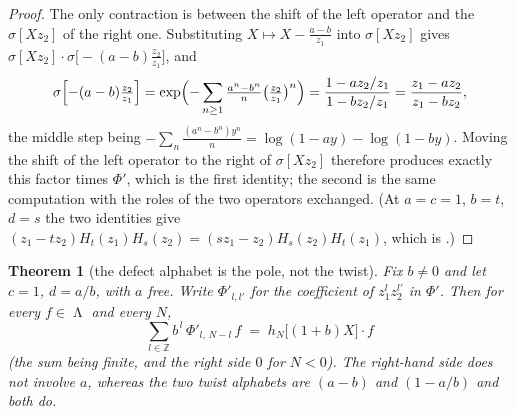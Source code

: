\documentclass[11pt]{article}
\newtheorem{theorem}{Theorem}[section]
\theoremstyle{definition}
\DeclareMathOperator{\Lam}{\Lambda}
\newcommand{\Z}{\mathbb{Z}}
\newcommand{\Hop}{H}
\begin{document}
\begin{proof}
The only contraction is between the shift of the left operator and the $\sigma[Xz_2]$ of the
right one.  Substituting $X\mapsto X-\frac{a-b}{z_1}$ into $\sigma[Xz_2]$ gives
$\sigma[Xz_2]\cdot\sigma\bigl[-(a-b)\tfrac{z_2}{z_1}\bigr]$, and
\[
  \sigma\Bigl[-(a-b)\tfrac{z_2}{z_1}\Bigr]
  =\exp\Bigl(-\sum_{n\ge1}\tfrac{a^n-b^n}{n}\bigl(\tfrac{z_2}{z_1}\bigr)^{n}\Bigr)
  =\frac{1-a z_2/z_1}{1-b z_2/z_1}=\frac{z_1-az_2}{z_1-bz_2},
\]
the middle step being $-\sum_n\frac{(a^n-b^n)y^n}{n}=\log(1-ay)-\log(1-by)$.  Moving the
shift of the left operator to the right of $\sigma[Xz_2]$ therefore produces exactly this
factor times $\Phi'$, which is the first identity; the second is the same computation with
the roles of the two operators exchanged.  (At $a=c=1$, $b=t$, $d=s$ the two identities give
$(z_1-tz_2)\Hop_t(z_1)\Hop_s(z_2)=(sz_1-z_2)\Hop_s(z_2)\Hop_t(z_1)$, which is
\cite[Thm.~2.4]{Q99}.)
\end{proof}

\begin{theorem}[the defect alphabet is the pole, not the twist]\label{thm:C}
Fix $b\neq0$ and let $c=1$, $d=a/b$, with $a$ \emph{free}.  Write $\Phi'_{l,l'}$ for the
coefficient of $z_1^{l}z_2^{l'}$ in $\Phi'$.  Then for every $f\in\Lam$ and every $N$,
\[
  \boxed{\ \sum_{l\in\Z}b^{\,l}\,\Phi'_{l,\,N-l}\,f\;=\;h_N\bigl[(1+b)X\bigr]\cdot f\ }
\]
(the sum being finite, and the right side $0$ for $N<0$).  The right-hand side does not
involve $a$, whereas the two twist alphabets are $(a-b)$ and $(1-a/b)$ and both do.
\end{theorem}
\end{document}
